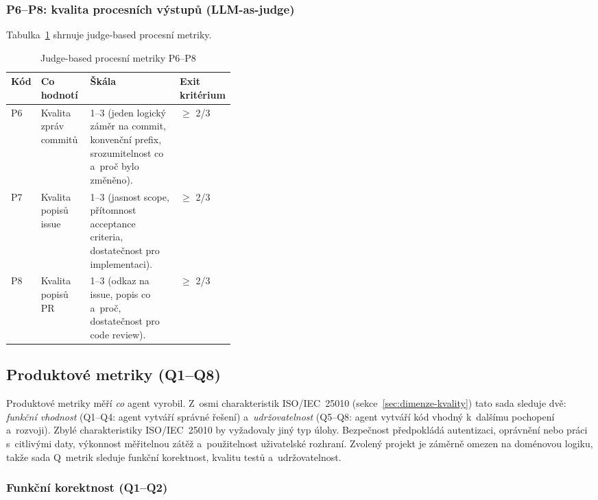 \subsubsection*{P6--P8: kvalita procesních výstupů (LLM-as-judge)}

Tabulka~\ref{tab:p6-p8} shrnuje judge-based procesní metriky.

\begin{table}[htbp]
\centering
\caption{Judge-based procesní metriky P6--P8}
\label{tab:p6-p8}
\footnotesize
\setlength{\tabcolsep}{4pt}
\begin{tabularx}{\linewidth}{@{}lp{0.22\linewidth}Xp{0.16\linewidth}@{}}
\toprule
\textbf{Kód} & \textbf{Co hodnotí} & \textbf{Škála} & \textbf{Exit kritérium} \\
\midrule
\acs{P6} & Kvalita zpráv commitů &
1--3 (jeden logický záměr na commit, konvenční prefix, srozumitelnost co a~proč bylo změněno). & $\geq$ 2/3 \\
\addlinespace
\acs{P7} & Kvalita popisů issue &
1--3 (jasnost scope, přítomnost acceptance criteria, dostatečnost pro
implementaci). & $\geq$ 2/3 \\
\addlinespace
\acs{P8} & Kvalita popisů PR &
1--3 (odkaz na issue, popis co a~proč, dostatečnost pro code review). & $\geq$ 2/3 \\
\bottomrule
\end{tabularx}
\end{table}
\FloatBarrier

\subsection{Produktové metriky (Q1--Q8)}
\label{sec:produktove-metriky}

Produktové metriky měří \textit{co} agent vyrobil. Z~osmi
charakteristik ISO/IEC~25010 (sekce~\ref{sec:dimenze-kvality})
tato sada sleduje dvě: \textit{funkční vhodnost}
(\acs{Q1}--\acs{Q4}: agent vytváří správné řešení)
a~\textit{udržovatelnost} (\acs{Q5}--\acs{Q8}: agent vytváří kód
vhodný k~dalšímu pochopení a~rozvoji). Zbylé charakteristiky
ISO/IEC~25010 by vyžadovaly jiný typ úlohy. Bezpečnost předpokládá
autentizaci, oprávnění nebo práci s~citlivými daty, výkonnost
měřitelnou zátěž a~použitelnost uživatelské rozhraní. Zvolený projekt
je záměrně omezen na doménovou logiku, takže sada Q~metrik sleduje
funkční korektnost, kvalitu testů a~udržovatelnost.

\subsubsection*{Funkční korektnost (Q1--Q2)}

